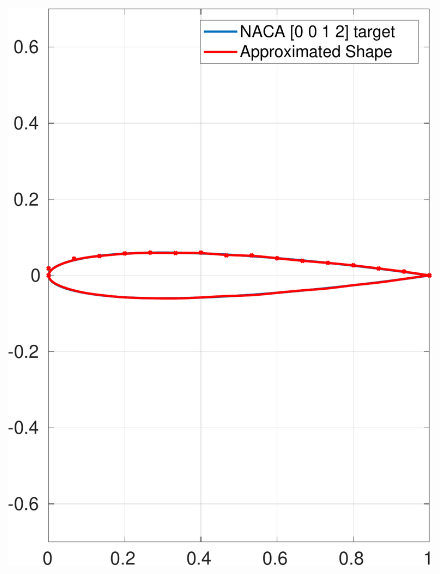\documentclass[paper=a4, fontsize=11pt]{scrartcl} %
\begin{document}
\begin{figure}[H]
\begin{minipage}{.5\textwidth}
            \includegraphics[width=.95\linewidth]{a3-shapematch-0012-final}
            \label{fig:solution0012}
        \end{minipage}
    \end{figure}
\end{document}
